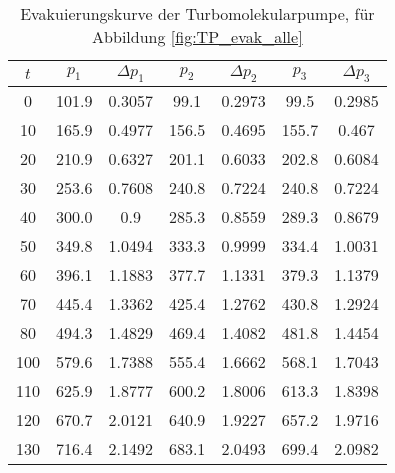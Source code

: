 \begin{table}[H]
    \centering
    \caption{Evakuierungskurve der Turbomolekularpumpe, für Abbildung \ref{fig:TP_evak_alle}}
    \label{tab:TP_evak_alle}
    \begin{tabular}{c c c c c c c}
        \toprule
        {$t$} & {$p_1$} & {$\Delta p_1$} & {$p_2$} & {$\Delta p_2$} & {$p_3$} & {$\Delta p_3$} \\
        \midrule
        0 & 101.9 & 0.3057 & 99.1 & 0.2973 & 99.5 & 0.2985     \\
        10 & 165.9 & 0.4977 & 156.5 & 0.4695 & 155.7 & 0.467   \\
        20 & 210.9 & 0.6327 & 201.1 & 0.6033 & 202.8 & 0.6084  \\
        30 & 253.6 & 0.7608 & 240.8 & 0.7224 & 240.8 & 0.7224  \\
        40 & 300.0 & 0.9 & 285.3 & 0.8559 & 289.3 & 0.8679     \\
        50 & 349.8 & 1.0494 & 333.3 & 0.9999 & 334.4 & 1.0031  \\
        60 & 396.1 & 1.1883 & 377.7 & 1.1331 & 379.3 & 1.1379  \\
        70 & 445.4 & 1.3362 & 425.4 & 1.2762 & 430.8 & 1.2924  \\
        80 & 494.3 & 1.4829 & 469.4 & 1.4082 & 481.8 & 1.4454  \\
        100 & 579.6 & 1.7388 & 555.4 & 1.6662 & 568.1 & 1.7043 \\
        110 & 625.9 & 1.8777 & 600.2 & 1.8006 & 613.3 & 1.8398 \\
        120 & 670.7 & 2.0121 & 640.9 & 1.9227 & 657.2 & 1.9716 \\
        130 & 716.4 & 2.1492 & 683.1 & 2.0493 & 699.4 & 2.0982 \\
        \bottomrule
    \end{tabular}
\end{table}

